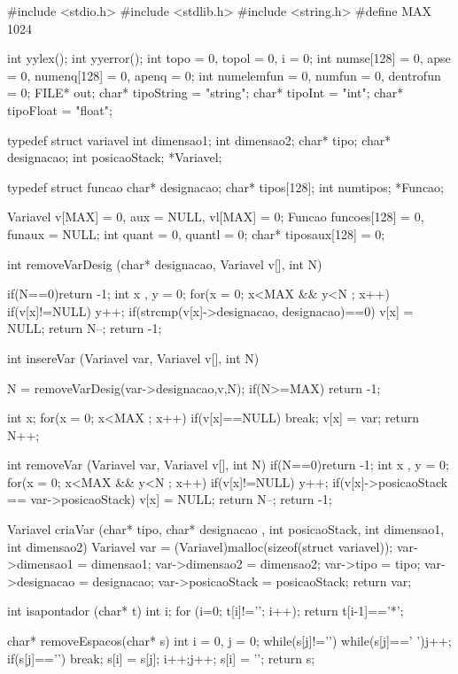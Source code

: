 \documentclass{report}
\begin{document}
\begin{code}

#include <stdio.h>
#include <stdlib.h>
#include <string.h>
#define MAX 1024

int yylex();
int yyerror();
int topo = 0, topol = 0, i = 0;
int numse[128] = {0}, apse = 0, numenq[128] = {0}, apenq = 0;
int numelemfun = 0, numfun = 0, dentrofun = 0; 
FILE* out;
char* tipoString = "string";
char* tipoInt = "int";
char* tipoFloat = "float";

typedef struct variavel{
	int   dimensao1;
	int   dimensao2;
	char* tipo;
	char* designacao;
	int   posicaoStack;
} *Variavel;

typedef struct funcao{
	char* designacao;
	char* tipos[128];
	int numtipos;
} *Funcao;

Variavel v[MAX] = {0}, aux = NULL, vl[MAX] = {0};
Funcao funcoes[128] = {0}, funaux = NULL;
int quant = 0, quantl = 0;
char* tiposaux[128] = {0};

int removeVarDesig (char* designacao, Variavel v[], int N){
	if(N==0)return -1;
	int x , y = 0;
	for(x = 0; x<MAX && y<N ; x++){
		if(v[x]!=NULL) y++;
		if(strcmp(v[x]->designacao, designacao)==0){
			v[x] = NULL;
			return N--;
		}
	}
	return -1;
	
}

int insereVar (Variavel var, Variavel v[], int N){
	N = removeVarDesig(var->designacao,v,N);
	if(N>=MAX) return -1;
	
	int x;
	for(x = 0; x<MAX ; x++){
		if(v[x]==NULL) break;	 
	}
	v[x] = var;
	return N++;
}

int removeVar (Variavel var, Variavel v[], int N){
	if(N==0)return -1;
	int x , y = 0;
	for(x = 0; x<MAX && y<N ; x++){
		if(v[x]!=NULL) y++;
		if(v[x]->posicaoStack == var->posicaoStack){
			v[x] = NULL;
			return N--;
		}
	}
	return -1;
}

Variavel criaVar (char* tipo, char* designacao , int posicaoStack, int dimensao1, int dimensao2){
	Variavel var = (Variavel)malloc(sizeof(struct variavel));
	var->dimensao1 = dimensao1;
	var->dimensao2 = dimensao2;
	var->tipo = tipo;
	var->designacao = designacao;
	var->posicaoStack = posicaoStack;
	return var;
}

int isapontador (char* t){
	int i;
	for (i=0; t[i]!='\0'; i++);
	return t[i-1]=='*';
}

char* removeEspacos(char* s){
	int i = 0, j = 0;
	while(s[j]!='\0'){
		while(s[j]==' '){j++;}
		if(s[j]=='\0') break;
		s[i] = s[j];
		i++;j++;
	}
	s[i] = '\0';
	return s;
}


\end{code}
\end{document}
